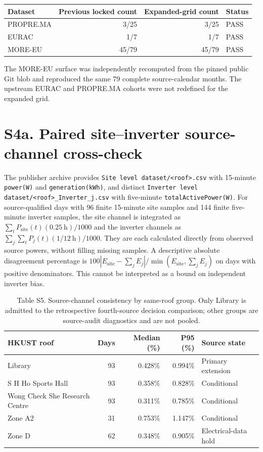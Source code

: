 \documentclass[11pt]{article}
\begin{document}
\begin{center}
\begin{tabular}{lrrl}
\toprule
Dataset & Previous locked count & Expanded-grid count & Status \\
\midrule
PROPRE.MA & 3/25 & 3/25 & PASS \\
EURAC & 1/7 & 1/7 & PASS \\
MORE-EU & 45/79 & 45/79 & PASS \\
\bottomrule
\end{tabular}
\end{center}

The MORE-EU surface was independently recomputed from the pinned public Git blob and reproduced the same 79 complete source-calendar months. The upstream EURAC and PROPRE.MA cohorts were not redefined for the expanded grid.

\section*{S4a. Paired site--inverter source-channel cross-check}
The publisher archive provides \texttt{Site level dataset/<roof>.csv} with 15-minute \texttt{power(W)} and \texttt{generation(kWh)}, and distinct \texttt{Inverter level dataset/<roof>\_Inverter\_j.csv} with five-minute \texttt{totalActivePower(W)}. For source-qualified days with 96 finite 15-minute site samples and 144 finite five-minute inverter samples, the site channel is integrated as $\sum_t P_{\mathrm{site}}(t)(0.25~\mathrm{h})/1000$ and the inverter channels as $\sum_j\sum_t P_j(t)(1/12~\mathrm{h})/1000$. They are each calculated directly from observed source powers, without filling missing samples. A descriptive absolute disagreement percentage is $100|E_{\mathrm{site}}-\sum_j E_j|/\min(E_{\mathrm{site}},\sum_jE_j)$ on days with positive denominators. This cannot be interpreted as a bound on independent inverter bias.

\begin{table}[h]
\centering
\caption*{Table S5. Source-channel consistency by same-roof group. Only Library is admitted to the retrospective fourth-source decision comparison; other groups are source-audit diagnostics and are not pooled.}
\small
\begin{tabular}{p{4.0cm}rrrp{2.4cm}}
\toprule
HKUST roof & Days & Median (\%) & P95 (\%) & Source state \\
\midrule
Library & 93 & 0.428\% & 0.994\% & Primary extension \\
S H Ho Sports Hall & 93 & 0.358\% & 0.828\% & Conditional \\
Wong Check She Research Centre & 93 & 0.311\% & 0.785\% & Conditional \\
Zone A2 & 31 & 0.753\% & 1.147\% & Conditional \\
Zone D & 62 & 0.348\% & 0.905\% & Electrical-data hold \\
\bottomrule
\end{tabular}
\end{table}
\end{document}
